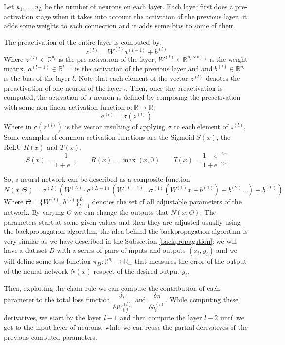 \documentclass[11pt,a4paper,openright,oneside]{book}
\numberwithin{equation}{section}
\begin{document}
{Let $n_1, \dots, n_L$ be the number of neurons on each layer. Each layer first does a pre-activation stage when it takes into account
the activation of the previous layer, it adds some weights to each connection and it adds some bias to some of them. 

The preactivation of the entire layer is computed by:
$$z^{(l)} = W^{(l)} a^{(l - 1)} + b^{(l)}$$
Where $z^{(l)} \in \mathbb{R}^{n_l}$ is the pre-activation of the layer, $W^{(l)} \in \mathbb{R}^{n_l \times n_{l-1}}$ is the weight matrix,
$a^{(l - 1)} \in \mathbb{R}^{l - 1}$ is the activation of the previous layer and
and $b^{(l)} \in \mathbb{R}^{n_l}$ is the bias of the layer $l$. Note that each element of the vector $z^{(l)}$ denotes the preactivation of
one neuron of the layer $l$. Then, once the preactivation is computed, the activation of a neuron is defined by composing the preactivation
with some non-linear activation function $\sigma : \mathbb{R} \rightarrow \mathbb{R}$:
$$a^{(l)} = \sigma(z^{(l)})$$
Where in $\sigma(z^{(l)})$ is the vector resulting of applying $\sigma$ to each element of $z^{(l)}$. Some examples of common activation functions are
the Sigmoid $S(x)$, the ReLU $R(x)$ and $T(x)$.
$$S(x) = \frac{1}{1 + e^{-x}} \qquad R(x) = \max(x, 0) \qquad T(x) = \frac{1-e^{-2x}}{1+e^{-2x}}$$

So, a neural network can be described as a composite function
$$N(x; \Theta) = \sigma^{(L)}(W^{(L)} \cdot \sigma^{(L - 1)}( W^{(L-1)} \dots \sigma^{(1)}(W^{(1)} x + b^{(1)}) + b^{(2)} \dots ) + b^{(L)})$$
Where $\Theta = \{W^{(l)}, b^{(l)}\}_{l=1}^L$ denotes the set of all adjustable parameters of the network.
By varying $\Theta$ we can change the outputs that $N(x; \Theta)$. The
parameters start at some given values and then they are adjusted usually using the backpropagation algorithm, the idea behind the backpropagation
algorithm is very similar as we have  
described in the Subsection \ref{backpropagation}: we will have a dataset $D$ with a series of pairs of inputs and outputs $(x_i, y_i)$ and we
will define some loss function $\pi_D : \mathbb{R}^{n_l} \rightarrow \mathbb{R}_+$ that measures the error of the output of the neural network $N(x)$ respect of the desired output $y_i$.

Then, exploiting the chain rule we can compute the contribution of each parameter to the total loss function $\dfrac{\delta \pi}{\delta W^{(l)}_{i, j}}$
and $\dfrac{\delta \pi}{\delta b^{(l)}_i}$. While computing these derivatives, we start by the layer $l-1$ and then
compute the layer $l-2$ until we get to the input layer of neurons, while we can reuse the partial derivatives of the previous
computed parameters.

}
\end{document}
